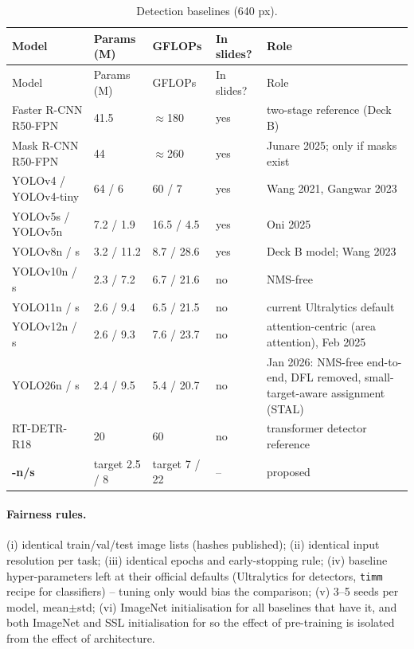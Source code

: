 \begin{longtable}{@{}L{3.6cm}L{1.6cm}L{1.6cm}L{1.6cm}L{6.6cm}@{}}
\caption{Detection baselines (640 px).}\label{tab:det_baselines}\\
\toprule
Model & Params (M) & GFLOPs & In slides? & Role \\
\midrule
\endfirsthead
\toprule
Model & Params (M) & GFLOPs & In slides? & Role \\
\midrule
\endhead
\bottomrule
\endfoot
Faster R-CNN R50-FPN & 41.5 & $\approx$180 & yes & two-stage reference (Deck B) \\
Mask R-CNN R50-FPN & 44 & $\approx$260 & yes & Junare 2025; only if masks exist \\
YOLOv4 / YOLOv4-tiny & 64 / 6 & 60 / 7 & yes & Wang 2021, Gangwar 2023 \\
YOLOv5s / YOLOv5n & 7.2 / 1.9 & 16.5 / 4.5 & yes & Oni 2025 \\
YOLOv8n / s & 3.2 / 11.2 & 8.7 / 28.6 & yes & Deck B model; Wang 2023 \\
YOLOv10n / s & 2.3 / 7.2 & 6.7 / 21.6 & no & NMS-free \\
YOLO11n / s & 2.6 / 9.4 & 6.5 / 21.5 & no & current Ultralytics default \\
YOLOv12n / s & 2.6 / 9.3 & 7.6 / 23.7 & no & attention-centric (area attention), Feb 2025 \\
YOLO26n / s & 2.4 / 9.5 & 5.4 / 20.7 & no & Jan 2026: NMS-free end-to-end, DFL removed, small-target-aware assignment (STAL) \\
RT-DETR-R18 & 20 & 60 & no & transformer detector reference \\
\textbf{\modeldet{}-n/s} & target 2.5 / 8 & target 7 / 22 & -- & proposed \\
\end{longtable}

\paragraph{Fairness rules.} (i) identical train/val/test image lists (hashes published); (ii) identical input resolution per task; (iii) identical epochs and early-stopping rule; (iv) baseline hyper-parameters left at their official defaults (Ultralytics for detectors, \texttt{timm} recipe for classifiers) -- tuning only \model{} would bias the comparison; (v) 3--5 seeds per model, mean$\pm$std; (vi) ImageNet initialisation for all baselines that have it, and both ImageNet and SSL initialisation for \model{} so the effect of pre-training is isolated from the effect of architecture.

